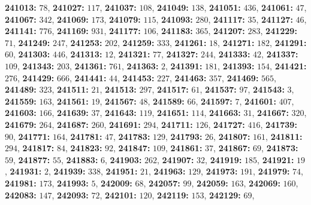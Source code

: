 \textsf{\bfseries 241013:} $78$, \textsf{\bfseries 241027:} $117$, \textsf{\bfseries 241037:} $108$, \textsf{\bfseries 241049:} $138$, \textsf{\bfseries 241051:} $436$, \textsf{\bfseries 241061:} $47$, \textsf{\bfseries 241067:} $342$, \textsf{\bfseries 241069:} $173$, \textsf{\bfseries 241079:} $115$, \textsf{\bfseries 241093:} $280$, \textsf{\bfseries 241117:} $35$, \textsf{\bfseries 241127:} $46$, \textsf{\bfseries 241141:} $776$, \textsf{\bfseries 241169:} $931$, \textsf{\bfseries 241177:} $106$, \textsf{\bfseries 241183:} $365$, \textsf{\bfseries 241207:} $283$, \textsf{\bfseries 241229:} $71$, \textsf{\bfseries 241249:} $247$, \textsf{\bfseries 241253:} $202$, \textsf{\bfseries 241259:} $333$, \textsf{\bfseries 241261:} $18$, \textsf{\bfseries 241271:} $182$, \textsf{\bfseries 241291:} $60$, \textsf{\bfseries 241303:} $446$, \textsf{\bfseries 241313:} $12$, \textsf{\bfseries 241321:} $77$, \textsf{\bfseries 241327:} $244$, \textsf{\bfseries 241333:} $42$, \textsf{\bfseries 241337:} $109$, \textsf{\bfseries 241343:} $203$, \textsf{\bfseries 241361:} $761$, \textsf{\bfseries 241363:} $2$, \textsf{\bfseries 241391:} $181$, \textsf{\bfseries 241393:} $154$, \textsf{\bfseries 241421:} $276$, \textsf{\bfseries 241429:} $666$, \textsf{\bfseries 241441:} $44$, \textsf{\bfseries 241453:} $227$, \textsf{\bfseries 241463:} $357$, \textsf{\bfseries 241469:} $565$, \textsf{\bfseries 241489:} $323$, \textsf{\bfseries 241511:} $21$, \textsf{\bfseries 241513:} $297$, \textsf{\bfseries 241517:} $61$, \textsf{\bfseries 241537:} $97$, \textsf{\bfseries 241543:} $3$, \textsf{\bfseries 241559:} $163$, \textsf{\bfseries 241561:} $19$, \textsf{\bfseries 241567:} $48$, \textsf{\bfseries 241589:} $66$, \textsf{\bfseries 241597:} $7$, \textsf{\bfseries 241601:} $407$, \textsf{\bfseries 241603:} $166$, \textsf{\bfseries 241639:} $37$, \textsf{\bfseries 241643:} $119$, \textsf{\bfseries 241651:} $114$, \textsf{\bfseries 241663:} $31$, \textsf{\bfseries 241667:} $320$, \textsf{\bfseries 241679:} $264$, \textsf{\bfseries 241687:} $260$, \textsf{\bfseries 241691:} $294$, \textsf{\bfseries 241711:} $126$, \textsf{\bfseries 241727:} $416$, \textsf{\bfseries 241739:} $90$, \textsf{\bfseries 241771:} $164$, \textsf{\bfseries 241781:} $47$, \textsf{\bfseries 241783:} $129$, \textsf{\bfseries 241793:} $26$, \textsf{\bfseries 241807:} $161$, \textsf{\bfseries 241811:} $294$, \textsf{\bfseries 241817:} $84$, \textsf{\bfseries 241823:} $92$, \textsf{\bfseries 241847:} $109$, \textsf{\bfseries 241861:} $37$, \textsf{\bfseries 241867:} $69$, \textsf{\bfseries 241873:} $59$, \textsf{\bfseries 241877:} $55$, \textsf{\bfseries 241883:} $6$, \textsf{\bfseries 241903:} $262$, \textsf{\bfseries 241907:} $32$, \textsf{\bfseries 241919:} $185$, \textsf{\bfseries 241921:} $19$, \textsf{\bfseries 241931:} $2$, \textsf{\bfseries 241939:} $338$, \textsf{\bfseries 241951:} $21$, \textsf{\bfseries 241963:} $129$, \textsf{\bfseries 241973:} $191$, \textsf{\bfseries 241979:} $74$, \textsf{\bfseries 241981:} $173$, \textsf{\bfseries 241993:} $5$, \textsf{\bfseries 242009:} $68$, \textsf{\bfseries 242057:} $99$, \textsf{\bfseries 242059:} $163$, \textsf{\bfseries 242069:} $160$, \textsf{\bfseries 242083:} $147$, \textsf{\bfseries 242093:} $72$, \textsf{\bfseries 242101:} $120$, \textsf{\bfseries 242119:} $153$, \textsf{\bfseries 242129:} $69$, 
